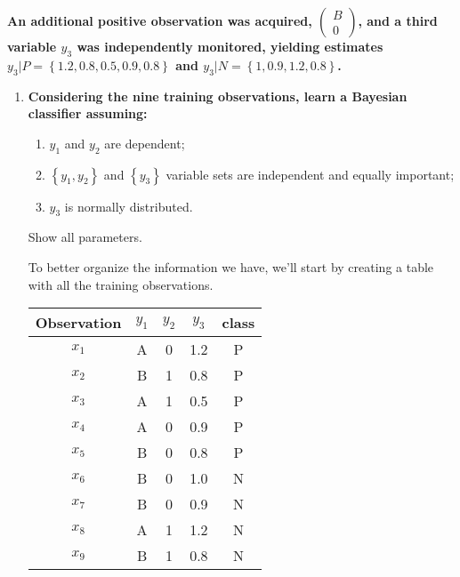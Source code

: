 \documentclass[12pt]{article}
\begin{document}
{\bfseries
An additional positive observation was acquired, \(
\begin{pmatrix}
    B \\
    0
\end{pmatrix}
\), and a third variable \(y_3\) was independently monitored, yielding estimates
\(
y_3 | P = \left\{1.2, 0.8, 0.5, 0.9, 0.8\right\}
\) and \(
y_3 | N = \left\{1, 0.9, 1.2, 0.8\right\}
\).
}

\begin{enumerate}[leftmargin=\labelsep,resume]
    \item {\bfseries Considering the nine training observations, learn a Bayesian classifier assuming:
          \begin{enumerate}[label=(\roman*)]
              \item \(y_1\) and \(y_2\) are dependent;
              \item \(\left\{y_1, y_2\right\}\) and \(\left\{y_3\right\}\) variable sets
                    are independent and equally important;
              \item \(y_3\) is normally distributed.
          \end{enumerate}
          Show all parameters.
          }

          To better organize the information we have, we'll start by creating a table
          with all the training observations.

          \begin{center}
              \begin{tabular}{c|cccc}
                  Observation & \(y_1\) & \(y_2\) & \(y_3\) & class \\
                  \hline
                  \(x_1\)     & A       & 0       & 1.2     & P     \\
                  \(x_2\)     & B       & 1       & 0.8     & P     \\
                  \(x_3\)     & A       & 1       & 0.5     & P     \\
                  \(x_4\)     & A       & 0       & 0.9     & P     \\
                  \(x_5\)     & B       & 0       & 0.8     & P     \\
                  \(x_6\)     & B       & 0       & 1.0     & N     \\
                  \(x_7\)     & B       & 0       & 0.9     & N     \\
                  \(x_8\)     & A       & 1       & 1.2     & N     \\
                  \(x_9\)     & B       & 1       & 0.8     & N
              \end{tabular}
          \end{center}


\end{enumerate}
\end{document}
